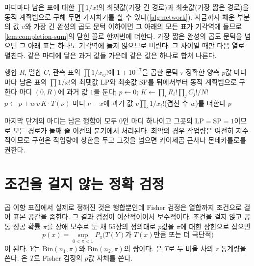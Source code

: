 마디마다 남은 표에 대한 $\prod1/x!$의 최댓값(가장 긴 경로)과 최솟값(가장 짧은 경로)을 동적 계획법으로 구해 두면 가지치기를 할 수 있다(\cref{alg:network}). 지금까지 채운 부분의 값 $v$와 가장 긴 완성의 곱도 문턱 이하이면 그 아래의 모든 표가 기각역에 들므로 \cref{lem:completion-sum}의 닫힌 꼴로 한꺼번에 더한다. 가장 짧은 완성의 곱도 문턱을 넘으면 그 아래 표는 하나도 기각역에 들지 않으므로 버린다. 그 사이일 때만 다음 열로 펼친다. 같은 마디에 닿은 과거 값들 가운데 같은 값은 하나로 합쳐 나른다.

\begin{algorithm}[t]
\begin{algorithmic}[1]
\Require 행합 $R$, 열합 $C$, 관측 표의 $\prod1/x_{ij}!$에 $1+10^{-7}$을 곱한 문턱 $\tau$
\Ensure 정확한 양측 $p$값
\State 마디마다 남은 표의 $\prod1/x!$의 최댓값 $\mathrm{LP}$와 최솟값 $\mathrm{SP}$를 뒤에서부터 동적 계획법으로 구한다
\State 마디 $(0,R)$에 과거 값 $1$을 둔다; $p\gets0$; $K\gets\prod_iR_i!\prod_jC_j!/N!$
     $p\gets p+w\,v\,K\cdot T(\nu)$ 
        \State 마디 $\nu-x$에 과거 값 $v\prod_i1/x_i!$(겹친 수 $w$)를 더한다
      \EndFor
    \EndIf
  \EndFor
\EndFor
\State \Return $p$
\end{algorithmic}
\caption{$r\times c$ Fisher 정확 검정의 망 알고리즘}
\label{alg:network}
\end{algorithm}

마지막 단계의 마디는 남은 행합이 모두 $0$인 마디 하나이고 그곳의 $\mathrm{LP}=\mathrm{SP}=1$이므로 모든 경로가 둘째 줄 이전의 분기에서 처리된다. 최악의 경우 작업량은 여전히 지수적이므로 구현은 작업량에 상한을 두고 그것을 넘으면 카이제곱 근사나 몬테카를로를 권한다.

\section{조건을 걸지 않는 정확 검정}
\label{sec:unconditional}

곱 이항 표집에서 실제로 정해진 것은 행합뿐인데 Fisher 검정은 열합까지 조건으로 걸어 표본 공간을 좁힌다. 그 결과 검정이 이산적이어서 보수적이다. 조건을 걸지 않고 공통 성공 확률 $\pi$를 장애 모수로 둔 채 55장의 정의대로 $p$값을 $\pi$에 대한 상한으로 잡으면
\[
p(x)=\sup_{0<\pi<1}P_\pi\bigl(T(Y)\text{가 }T(x)\text{만큼 또는 더 극단적}\bigr)
\]
이 된다. $Y$는 $\mathrm{Bin}(n_1,\pi)$와 $\mathrm{Bin}(n_2,\pi)$의 쌍이다. 은 $T$로 두 비율 차의 $z$ 통계량을 쓴다\cite{barnard1945}. 은 $T$로 Fisher 검정의 $p$값 자체를 쓴다\cite{boschloo1970}.

